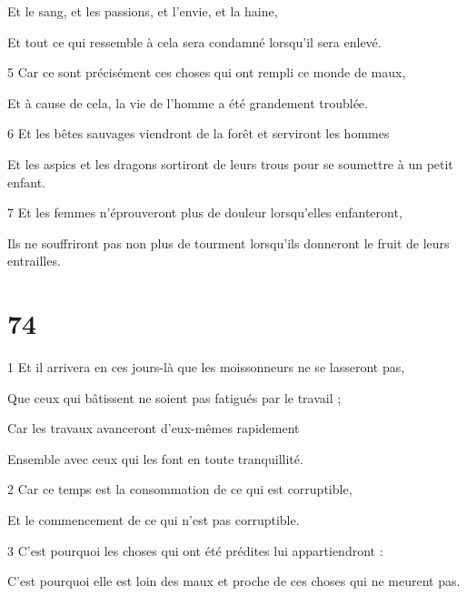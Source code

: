 \par Et le sang, et les passions, et l'envie, et la haine,

\par Et tout ce qui ressemble à cela sera condamné lorsqu'il sera enlevé.

\par 5 Car ce sont précisément ces choses qui ont rempli ce monde de maux,

\par Et à cause de cela, la vie de l'homme a été grandement troublée.

\par 6 Et les bêtes sauvages viendront de la forêt et serviront les hommes

\par Et les aspics et les dragons sortiront de leurs trous pour se soumettre à un petit enfant.

\par 7 Et les femmes n'éprouveront plus de douleur lorsqu'elles enfanteront,

\par Ils ne souffriront pas non plus de tourment lorsqu'ils donneront le fruit de leurs entrailles.

\chapter{74}

\par 1 Et il arrivera en ces jours-là que les moissonneurs ne se lasseront pas,

\par Que ceux qui bâtissent ne soient pas fatigués par le travail ;

\par Car les travaux avanceront d'eux-mêmes rapidement

\par Ensemble avec ceux qui les font en toute tranquillité.

\par 2 Car ce temps est la consommation de ce qui est corruptible,

\par Et le commencement de ce qui n'est pas corruptible.

\par 3 C'est pourquoi les choses qui ont été prédites lui appartiendront :

\par C'est pourquoi elle est loin des maux et proche de ces choses qui ne meurent pas.

